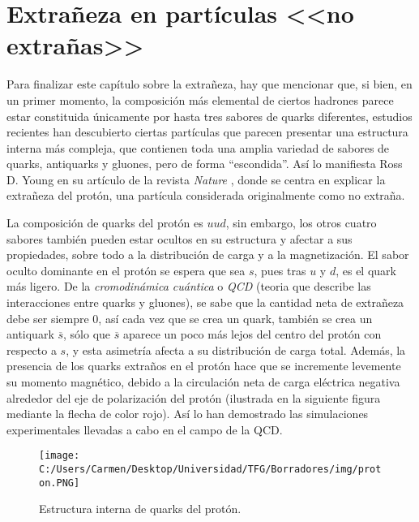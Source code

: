 \section{Extrañeza en partículas <<no extrañas>>}
\label{cap:non-strange_particles}
\vspace{5mm}

Para finalizar este capítulo sobre la extrañeza, hay que mencionar que, si bien, en un primer momento, la composición más elemental de ciertos hadrones parece estar constituida únicamente por hasta tres sabores de quarks diferentes, estudios recientes han descubierto ciertas partículas que parecen presentar una estructura interna más compleja, que contienen toda una amplia variedad de sabores de quarks, antiquarks y gluones, pero de forma ``escondida''. Así lo manifiesta Ross D. Young en su artículo de la revista \textit{Nature} \cite{protonYoung}, donde se centra en explicar la extrañeza del protón, una partícula considerada originalmente como no extraña. 

La composición de quarks del protón es $uud$, sin embargo, los otros cuatro sabores también pueden estar ocultos en su estructura y afectar a sus propiedades, sobre todo a la distribución de carga y a la magnetización. El sabor oculto dominante en el protón se espera que sea $s$, pues tras $u$ y $d$, es el quark más ligero. De la \textit{cromodinámica cuántica} o \textit{QCD} (teoria que describe las interacciones entre quarks y gluones), se sabe que la cantidad neta de extrañeza debe ser siempre 0, así cada vez que se crea un quark, también se crea un antiquark $\overline{s}$, sólo que $\overline{s}$ aparece un poco más lejos del centro del protón con respecto a $s$, y esta asimetría afecta a su distribución de carga total. Además, la presencia de los quarks extraños en el protón hace que se incremente levemente su momento magnético, debido a la circulación neta de carga eléctrica negativa alrededor del eje de polarización del protón\cite{protonYoung} (ilustrada en la siguiente figura mediante la flecha de color rojo). Así lo han demostrado las simulaciones experimentales llevadas a cabo en el campo de la QCD.\\

\begin{figure}[h]
	\centering
	\texttt{[image: C:/Users/Carmen/Desktop/Universidad/TFG/Borradores/img/proton.PNG]}
	\caption[Estructura interna del protón]
	{Estructura interna de quarks del protón. \cite{protonYoung}}
	\label{fig:proton}
\end{figure}

